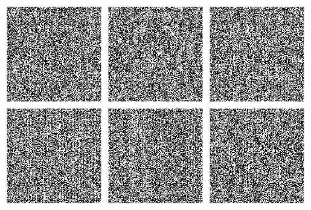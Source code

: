 \documentclass[twocolumn]{article}
\begin{document}
\noindent
\includegraphics[height=1.7in]{q01}
\includegraphics[height=1.7in]{q02}
\includegraphics[height=1.7in]{q03}
\includegraphics[height=1.7in]{q04}
\includegraphics[height=1.7in]{q05}
\includegraphics[height=1.7in]{q06}
\end{document}
